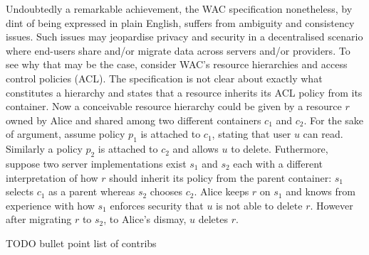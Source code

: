 Undoubtedly a remarkable achievement, the WAC specification nonetheless,
by dint of being expressed in plain English, suffers from ambiguity
and consistency issues. Such issues may jeopardise privacy and security
in a decentralised scenario where end-users share and/or migrate data
across servers and/or providers. To see why that may be the case,
consider WAC's resource hierarchies and access control policies (ACL).
The specification is not clear about exactly what constitutes a hierarchy
and states that a resource inherits its ACL policy from its container.
Now a conceivable resource hierarchy could be given by a resource $r$
owned by Alice and shared among two different containers $c_1$ and
$c_2$. For the sake of argument, assume policy $p_1$ is attached to
$c_1$, stating that user $u$ can read. Similarly a policy $p_2$ is
attached to $c_2$ and allows $u$ to delete. Futhermore, suppose two
server implementations exist $s_1$ and $s_2$ each with a different
interpretation of how $r$ should inherit its policy from the parent
container: $s_1$ selects $c_1$ as a parent whereas $s_2$ chooses $c_2$.
Alice keeps $r$ on $s_1$ and knows from experience with how $s_1$
enforces security that $u$ is not able to delete $r$. However after
migrating $r$ to $s_2$, to Alice's dismay, $u$ deletes $r$.


TODO bullet point list of contribs
